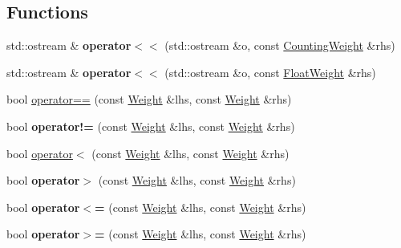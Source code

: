 \subsection*{Functions}
\begin{DoxyCompactItemize}
\item 
\mbox{\label{group__weight_gab340452fea725573e28644234d68147e}} 
std\+::ostream \& {\bfseries operator$<$$<$} (std\+::ostream \&o, const \mbox{\hyperlink{classCountingWeight}{Counting\+Weight}} \&rhs)
\item 
\mbox{\label{group__weight_ga28da9ceeeef71d7da863914db5247228}} 
std\+::ostream \& {\bfseries operator$<$$<$} (std\+::ostream \&o, const \mbox{\hyperlink{classFloatWeight}{Float\+Weight}} \&rhs)
\item 
bool \mbox{\hyperlink{group__weight_ga985964770c3e3b3aea4ea1ebd817f1c8}{operator==}} (const \mbox{\hyperlink{classWeight}{Weight}} \&lhs, const \mbox{\hyperlink{classWeight}{Weight}} \&rhs)
\item 
\mbox{\label{group__weight_ga3f8df07b63284c0a1d9da46b7d01588e}} 
bool {\bfseries operator!=} (const \mbox{\hyperlink{classWeight}{Weight}} \&lhs, const \mbox{\hyperlink{classWeight}{Weight}} \&rhs)
\item 
bool \mbox{\hyperlink{group__weight_gaf058ecdf4336e4dff64400d149c791f9}{operator$<$}} (const \mbox{\hyperlink{classWeight}{Weight}} \&lhs, const \mbox{\hyperlink{classWeight}{Weight}} \&rhs)
\item 
\mbox{\label{group__weight_ga3eb9b7d865559995803e57f557f085b3}} 
bool {\bfseries operator$>$} (const \mbox{\hyperlink{classWeight}{Weight}} \&lhs, const \mbox{\hyperlink{classWeight}{Weight}} \&rhs)
\item 
\mbox{\label{group__weight_ga37b0ffb977541c9ff2ee7fdc3ec9fd0c}} 
bool {\bfseries operator$<$=} (const \mbox{\hyperlink{classWeight}{Weight}} \&lhs, const \mbox{\hyperlink{classWeight}{Weight}} \&rhs)
\item 
\mbox{\label{group__weight_ga77d4e41a067e6104b5783f06a5018a1c}} 
bool {\bfseries operator$>$=} (const \mbox{\hyperlink{classWeight}{Weight}} \&lhs, const \mbox{\hyperlink{classWeight}{Weight}} \&rhs)
\item 

\end{DoxyCompactItemize}
